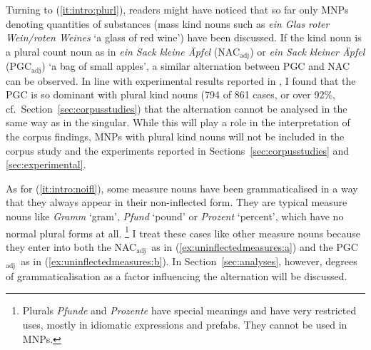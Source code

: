 \documentclass[USenglish]{article}
\newcommand{\Sub}[1]{\ensuremath{\mathrm{_{#1}}}}
\newcommand{\NACa}{NAC\Sub{adj}}
\newcommand{\PGCa}{PGC\Sub{adj}}
\begin{document}
Turning to (\ref{it:intro:plurl}), readers might have noticed that so far only MNPs denoting quantities of substances (mass kind nouns such as \textit{ein Glas roter Wein\slash roten Weines} `a glass of red wine') have been discussed.
If the kind noun is a plural count noun as in \textit{ein Sack kleine Äpfel} (\NACa) or \textit{ein Sack kleiner Äpfel} (\PGCa) `a bag of small apples', a similar alternation between PGC and NAC can be observed.
In line with experimental results reported in \citet[15--16]{Zimmer2015}, I found that the PGC is so dominant with plural kind nouns (794 of 861 cases, or over 92\%, cf.\ Section~\ref{sec:corpusstudies}) that the alternation cannot be analysed in the same way as in the singular.
While this will play a role in the interpretation of the corpus findings, MNPs with plural kind nouns will not be included in the corpus study and the experiments reported in Sections~\ref{sec:corpusstudies} and \ref{sec:experimental}.

As for (\ref{it:intro:noifl}), some measure nouns have been grammaticalised in a way that they always appear in their non-inflected form.
They are typical measure nouns like \textit{Gramm} `gram', \textit{Pfund} `pound' or \textit{Prozent} `percent', which have no normal plural forms at all.%
\footnote{Plurals \textit{Pfunde} and \textit{Prozente} have special meanings and have very restricted uses, mostly in idiomatic expressions and prefabs.
They cannot be used in MNPs.}
I treat these cases like other measure nouns because they enter into both the \NACa\ as in (\ref{ex:uninflectedmeasures:a}) and the \PGCa\ as in (\ref{ex:uninflectedmeasures:b}).
In Section~\ref{sec:analyses}, however, degrees of grammaticalisation as a factor influencing the alternation will be discussed.

\begin{exe}
  \ex\label{ex:uninflectedmeasures}
  \begin{xlist}
  \end{xlist}
\end{exe}
\end{document}
